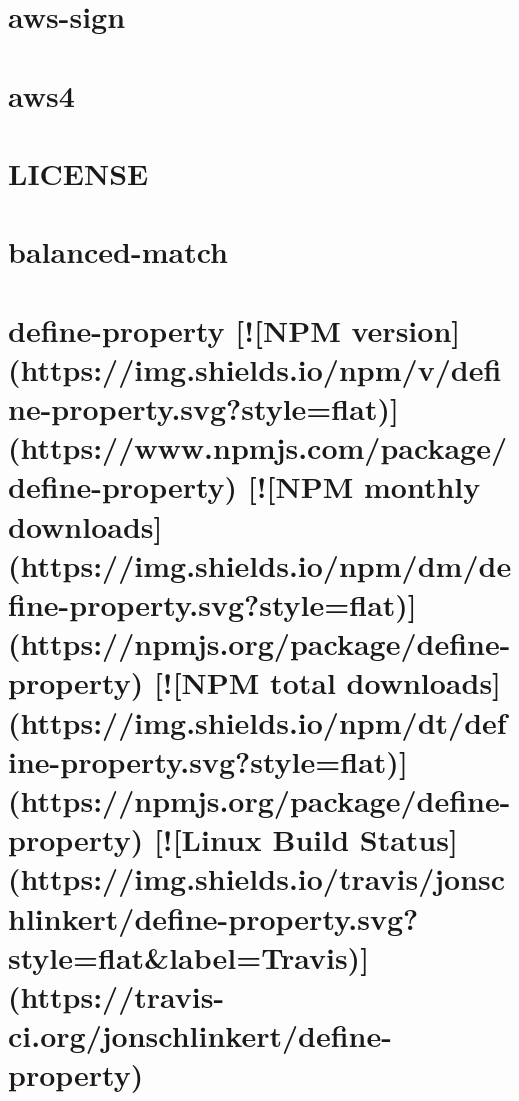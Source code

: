 \documentclass[twoside]{book}
\newcommand{\+}{\discretionary{\mbox{\scriptsize$\hookleftarrow$}}{}{}}
\begin{document}
\chapter{aws-\/sign}
\label{md_dsmacc_vis_degree_node_modules_aws-sign2_README}

\chapter{aws4}
\label{md_dsmacc_vis_degree_node_modules_aws4_README}

\chapter{L\+I\+C\+E\+N\+SE}
\label{md_dsmacc_vis_degree_node_modules_balanced-match_LICENSE}

\chapter{balanced-\/match}
\label{md_dsmacc_vis_degree_node_modules_balanced-match_README}

\chapter{define-\/property \mbox{[}!\mbox{[}N\+PM version\mbox{]}(https\+://img.shields.\+io/npm/v/define-\/property.svg?style=flat)\mbox{]}(https\+://www.npmjs.\+com/package/define-\/property) \mbox{[}!\mbox{[}N\+PM monthly downloads\mbox{]}(https\+://img.shields.\+io/npm/dm/define-\/property.svg?style=flat)\mbox{]}(https\+://npmjs.org/package/define-\/property) \mbox{[}!\mbox{[}N\+PM total downloads\mbox{]}(https\+://img.shields.\+io/npm/dt/define-\/property.svg?style=flat)\mbox{]}(https\+://npmjs.org/package/define-\/property) \mbox{[}!\mbox{[}Linux Build Status\mbox{]}(https\+://img.shields.\+io/travis/jonschlinkert/define-\/property.svg?style=flat\&label=Travis)\mbox{]}(https\+://travis-\/ci.org/jonschlinkert/define-\/property)}
\label{md_dsmacc_vis_degree_node_modules_base_node_modules_define-property_README}

\end{document}

